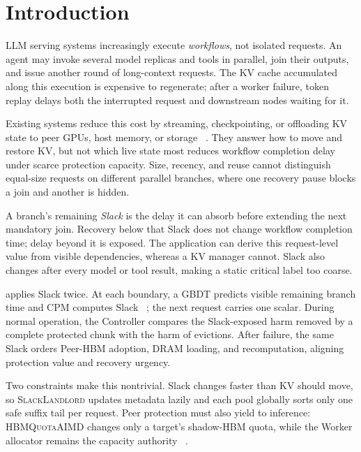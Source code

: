 \section{Introduction}
\label{sec:introduction}

LLM serving systems increasingly execute \emph{workflows}, not isolated
requests.  An agent may invoke several model replicas and tools in parallel,
join their outputs, and issue another round of long-context requests.  The KV
cache accumulated along this execution is expensive to regenerate; after a
worker failure, token replay delays both the interrupted request and downstream
nodes waiting for it.

Existing systems reduce this cost by streaming, checkpointing, or offloading KV
state to peer GPUs, host memory, or storage
~\cite{strati2024dejavu,jayakody2026ghostserve,qin2025mooncake,xie2025hicache}.
They answer how to move and restore KV, but not which live state most reduces
workflow completion delay under scarce protection capacity.  Size, recency,
and reuse cannot distinguish equal-size requests on different parallel
branches, where one recovery pause blocks a join and another is hidden.

A branch's remaining \emph{Slack} is the delay it can absorb before extending
the next mandatory join.  Recovery below that Slack does not change workflow
completion time; delay beyond it is exposed.  The application can derive this
request-level value from visible dependencies, whereas a KV manager cannot.
Slack also changes after every model or tool result, making a static critical
label too coarse.

\system{} applies Slack twice.  At each boundary, a GBDT predicts visible
remaining branch time and CPM computes Slack
~\cite{friedman2001gbdt,kelley1959criticalpath}; the next request carries one
scalar.  During normal operation, the Controller compares the Slack-exposed
harm removed by a complete protected chunk with the harm of evictions.  After
failure, the same Slack orders Peer-HBM adoption, DRAM loading, and
recomputation, aligning protection value and recovery urgency.

Two constraints make this nontrivial.  Slack changes faster than KV should
move, so \textsc{SlackLandlord} updates metadata lazily and each pool globally
sorts only one safe suffix tail per request.  Peer protection must also yield
to inference: \textsc{HBMQuotaAIMD} changes only a target's shadow-HBM quota,
while the Worker allocator remains the capacity authority
~\cite{chiu1989aimd}.


